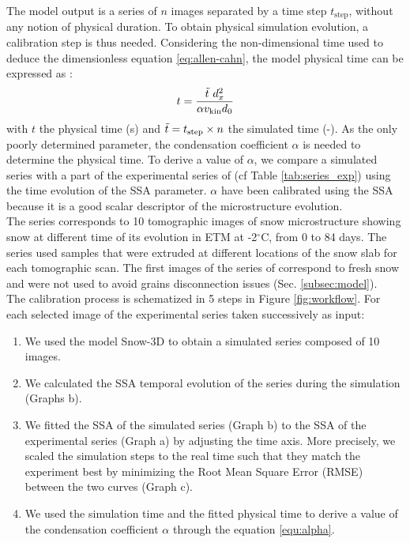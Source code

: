 \documentclass[draft,ms]{agujournal2019}
\begin{document}
 The model output is a series of $n$ images separated by a time step $t_{\mathrm{step}}$, without any notion of physical duration. To obtain physical simulation evolution, a calibration step is thus needed.
Considering the non-dimensional time used to deduce the dimensionless equation \eqref{eq:allen-cahn}, the model physical time can be expressed as \cite{bretin_and_denis_discrete-continuous_2015}: 
\begin{equation}\label{equ:alpha}
   t = \frac{\Tilde{t}\ d_x^2}{\alpha v_{\mathrm{kin}} d_0}
\end{equation}
with $t$ the physical time (s) and $\Tilde{t} = t_{\mathrm{step}} \times n$ the simulated time (-). As the only poorly determined parameter, the condensation coefficient $\alpha$ is needed to determine the physical time. To derive a value of $\alpha$, we compare a simulated series with a part of the experimental series of  (cf Table \ref{tab:series_exp}) using the time evolution of the SSA parameter. $\alpha$ have been calibrated using the SSA because it is a good scalar descriptor of the microstructure evolution.\\
The series corresponds to 10 tomographic images of snow microstructure showing snow at different time of its evolution in ETM at -2$^\circ$C, from 0 to 84 days. The series used samples that were extruded at different locations of the snow slab for each tomographic scan. The first images of the series of  correspond to fresh snow and were not used to avoid grains disconnection issues (Sec. \ref{subsec:model}).\\
The calibration process is schematized in 5 steps in Figure \ref{fig:workflow}. For each selected image of the experimental series taken successively as input: \\
\begin{enumerate}
    \item We used the model Snow-3D to obtain a simulated series composed of 10 images. 
    \item We calculated the SSA temporal evolution of the series during the simulation (Graphs b).
    \item We fitted the SSA of the simulated series (Graph b) to the SSA of the experimental series (Graph a) by adjusting the time axis. More precisely, we scaled the simulation steps to the real time such that they match the experiment best by minimizing the Root Mean Square Error (RMSE) between the two curves (Graph c).   
    \item We used the simulation time and the fitted physical time to derive a value of the condensation coefficient $\alpha$ through the equation \eqref{equ:alpha}. 
\end{enumerate}
\end{document}
